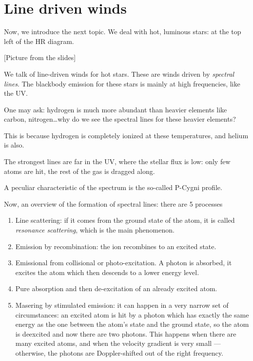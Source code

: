 \documentclass[main.tex]{subfiles}
\begin{document}
\section{Line driven winds}

Now, we introduce the next topic.
We deal with hot, luminous stars: at the top left of the HR diagram.

[Picture from the slides]

We talk of line-driven winds for hot stars.
These are winds driven by \emph{spectral lines}. 
The blackbody emission for these stars is mainly at high frequencies, like the UV.

One may ask: hydrogen is much more abundant than heavier elements like carbon, nitrogen\dots why do we see the spectral lines for these heavier elements?

This is because hydrogen is completely ionized at these temperatures, and helium is also.

The strongest lines are far in the UV, where the stellar flux is low: only few atoms are hit, the rest of the gas is dragged along.

A peculiar characteristic of the spectrum is the so-called P-Cygni profile.

Now, an overview of the formation of spectral lines:
there are 5 processes \begin{enumerate}
    \item Line scattering: if it comes from the ground state of the atom, it is called \emph{resonance scattering}, which is the main phenomenon.
    \item Emission by recombination: the ion recombines to an excited state.
    \item Emissional from collisional or photo-excitation. A photon is absorbed, it excites the atom which then descends to a lower energy level.
    \item Pure absorption and then de-excitation of an already excited atom.
    \item Masering by stimulated emission: it can happen in a very narrow set of circumstances: an excited atom is hit by a photon which has exactly the same energy as the one between the atom's state and the ground state, so the atom is deexcited and now there are two photons.
    This happens when there are many excited atoms, and when the velocity gradient is very small --- otherwise, the photons are Doppler-shifted out of the right frequency.
\end{enumerate}
\end{document}
